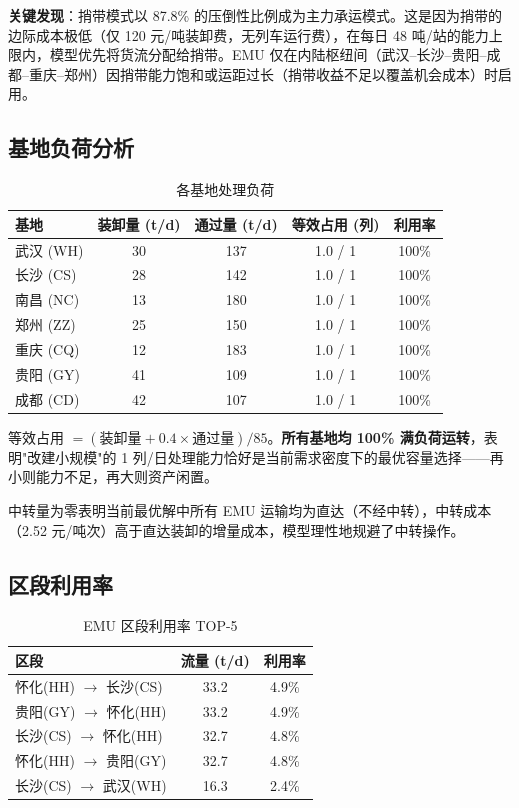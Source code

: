 \documentclass[12pt,a4paper,fontset=none]{ctexart}
\begin{document}
\textbf{关键发现}：捎带模式以 87.8\% 的压倒性比例成为主力承运模式。这是因为捎带的边际成本极低（仅 120 元/吨装卸费，无列车运行费），在每日 48 吨/站的能力上限内，模型优先将货流分配给捎带。EMU 仅在内陆枢纽间（武汉--长沙--贵阳--成都--重庆--郑州）因捎带能力饱和或运距过长（捎带收益不足以覆盖机会成本）时启用。

\subsection{基地负荷分析}

\begin{table}[H]
\centering
\caption{各基地处理负荷}
\label{tab:base_load}
\begin{tabular}{lcccc}
\toprule
基地 & 装卸量 (t/d) & 通过量 (t/d) & 等效占用 (列) & 利用率 \\
\midrule
武汉 (WH)  & 30 & 137 & 1.0 / 1 & 100\% \\
长沙 (CS)  & 28 & 142 & 1.0 / 1 & 100\% \\
南昌 (NC)  & 13 & 180 & 1.0 / 1 & 100\% \\
郑州 (ZZ)  & 25 & 150 & 1.0 / 1 & 100\% \\
重庆 (CQ)  & 12 & 183 & 1.0 / 1 & 100\% \\
贵阳 (GY)  & 41 & 109 & 1.0 / 1 & 100\% \\
成都 (CD)  & 42 & 107 & 1.0 / 1 & 100\% \\
\bottomrule
\end{tabular}
\end{table}

等效占用 $= (\text{装卸量} + 0.4\times\text{通过量}) / 85$。\textbf{所有基地均 100\% 满负荷运转}，表明"改建小规模"的 1 列/日处理能力恰好是当前需求密度下的最优容量选择——再小则能力不足，再大则资产闲置。

中转量为零表明当前最优解中所有 EMU 运输均为直达（不经中转），中转成本（2.52 元/吨次）高于直达装卸的增量成本，模型理性地规避了中转操作。

\subsection{区段利用率}

\begin{table}[H]
\centering
\caption{EMU 区段利用率 TOP-5}
\label{tab:edge_util}
\begin{tabular}{lcc}
\toprule
区段 & 流量 (t/d) & 利用率 \\
\midrule
怀化(HH) $\to$ 长沙(CS)  & 33.2 & 4.9\% \\
贵阳(GY) $\to$ 怀化(HH)  & 33.2 & 4.9\% \\
长沙(CS) $\to$ 怀化(HH)  & 32.7 & 4.8\% \\
怀化(HH) $\to$ 贵阳(GY)  & 32.7 & 4.8\% \\
长沙(CS) $\to$ 武汉(WH)  & 16.3 & 2.4\% \\
\bottomrule
\end{tabular}
\end{table}
\end{document}
